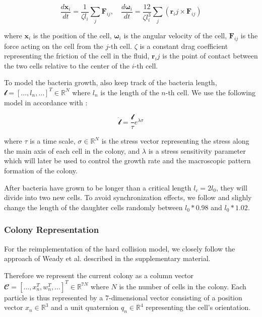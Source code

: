 \documentclass[conference]{IEEEtran}
\begin{document}
$$
    \frac{d \mathbf{x}_i}{dt} = \frac{1}{\zeta l_i} \sum_j \mathbf{F}_{ij}, \quad \frac{d \mathbf{\omega}_i}{dt} = \frac{12}{\zeta l_i^3} \sum_j (\mathbf{r}_ij \times \mathbf{F}_{ij})
$$
\label{eq:overdamped_langevin}

where $\mathbf{x}_i$ is the position of the cell, $\mathbf{\omega}_i$ is the angular velocity of the cell, $\mathbf{F}_{ij}$ is the force acting on the cell from the $j$-th cell. $\zeta$ is a constant drag coefficient representing the friction of the cell in the fluid, $\mathbf{r}_ij$ is the point of contact between the two cells relative to the center of the $i$-th cell.


To model the bacteria growth, also keep track of the bacteria length, $\mathbfcal{l} = [\dots, l_n, \dots]^T \in \mathbb{R}^{N}$ where $l_n$ is the length of the $n$-th cell. We use the following model in accordance with \cite{Weady2024}:

$$
    \dot{\mathbfcal{l}} =  \frac{\mathbfcal{l}}{\tau} e^{\lambda \mathbfcal{\sigma}}
$$

where $\tau$ is a time scale, $\mathbfcal{\sigma} \in \mathbb{R}^{N}$ is the stress vector representing the stress along the main axis of each cell in the colony, and $\lambda$ is a stress sensitivity parameter which will later be used to control the growth rate and the macroscopic pattern formation of the colony.

After bacteria have grown to be longer than a critical length $l_c = 2l_0$, they will divide into two new cells. To avoid synchronization effects, we follow \cite{Khan_2024} and slighly change the length of the daughter cells randomly between $l_0*0.98$ and $l_0*1.02$.


\subsubsection{Colony Representation}

For the reimplementation of the hard collision model, we closely follow the approach of Weady et al. \cite{Weady2024} described in the supplementary material.

Therefore we represent the current colony as a column vector $\mathbfcal{C} = [\dots, x_n^T, w_n^T, \dots]^T \in \mathbb{R}^{7N}$ where $N$ is the number of cells in the colony. Each particle is thus represented by a 7-dimensional vector consisting of a position vector $x_n \in \mathbb{R}^3$ and a unit quaternion $q_n \in \mathbb{R}^4$ representing the cell's orientation.
\end{document}
